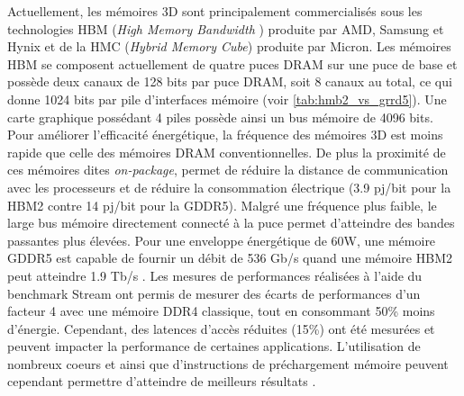         
        Actuellement, les mémoires 3D sont principalement commercialisés sous les technologies HBM (\textit{High Memory Bandwidth} \cite{Standard2013}) produite par AMD, Samsung et Hynix et de la HMC (\textit{Hybrid Memory Cube}\cite{Jeddeloh2012}) produite par Micron. Les mémoires HBM se composent actuellement de quatre puces DRAM sur une puce de base et possède deux canaux de 128 bits par puce DRAM, soit 8 canaux au total, ce qui donne 1024 bits par pile d'interfaces mémoire (voir \autoref{tab:hmb2_vs_grrd5}). Une carte graphique possédant 4 piles possède ainsi un bus mémoire de 4096 bits. Pour améliorer l'efficacité énergétique, la fréquence des mémoires 3D est moins rapide que celle des mémoires DRAM conventionnelles. De plus la proximité de ces mémoires dites \textit{on-package}, permet de réduire la distance de communication avec les processeurs et de réduire la consommation électrique (3.9 pj/bit pour la HBM2 contre 14 pj/bit pour la GDDR5). Malgré une fréquence plus faible, le large bus mémoire directement connecté à la puce permet d'atteindre des bandes passantes plus élevées. Pour une enveloppe énergétique de 60W, une mémoire GDDR5 est capable de fournir un débit de 536 Gb/s quand une mémoire HBM2 peut atteindre 1.9 Tb/s \cite{OConnor2017}. Les mesures de performances réalisées à l'aide du benchmark Stream ont permis de mesurer des écarts de performances d'un facteur 4 avec une mémoire DDR4 classique\cite{7965110}, tout en consommant 50\% moins d'énergie. Cependant, des latences d'accès réduites (15\%) ont été mesurées et peuvent impacter la performance de certaines applications. L'utilisation de nombreux coeurs et ainsi que d'instructions de préchargement mémoire peuvent cependant permettre d'atteindre de meilleurs résultats \cite{7965110}.
        
        \begin{table}[]
        \centering
        \caption{Comparaison des mémoires GDDR5 utilisées sur les GPU NVidia K80 et des mémoires HBM2 utilisées sur un GPU utilisant 4 piles de mémoire.}
        \label{tab:hmb2_vs_grrd5}
        \end{table}
         
